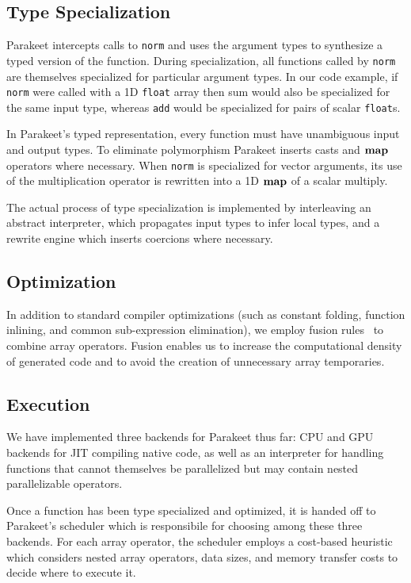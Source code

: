 \documentclass[10pt,twocolumn]{article}
\begin{document}
\subsection{Type Specialization}
Parakeet intercepts calls to \lstinline{norm} and uses the argument types to synthesize a typed version of the function. During specialization, all functions called by \lstinline{norm} are themselves specialized for particular argument types. In our code example, if \lstinline{norm} were called with a 1D \lstinline{float} array then sum would also be specialized for the same input type, whereas \lstinline{add} would be specialized for pairs of scalar \lstinline{float}s.

In Parakeet's typed representation, every function must have unambiguous input and output types. To eliminate polymorphism Parakeet inserts casts and $\mbox{\textbf{map}}$ operators where necessary. When \lstinline{norm} is specialized for vector arguments, its use of the multiplication operator is rewritten into a 1D $\mbox{\textbf{map}}$ of a scalar multiply.

The actual process of type specialization is implemented by interleaving an abstract interpreter, which propagates input types to infer local types, and a rewrite engine which inserts coercions where necessary.

\subsection{Optimization}
In addition to standard compiler optimizations (such as constant folding, function inlining, and common sub-expression elimination), we employ fusion rules~\cite{AbuSufah79, Jones01, Kennedy93} to combine array operators. Fusion enables us to increase the computational density of generated code and to avoid the creation of unnecessary array temporaries.

\subsection{Execution}
We have implemented three backends for Parakeet thus far: CPU and GPU backends for JIT compiling native code, as well as an interpreter for handling functions that cannot themselves be parallelized but may contain nested parallelizable operators.

Once a function has been type specialized and optimized, it is handed off to Parakeet's scheduler which is responsibile for choosing among these three backends.  For each array operator, the scheduler employs a cost-based heuristic which considers nested array operators, data sizes, and memory transfer costs to decide where to execute it.
\end{document}
